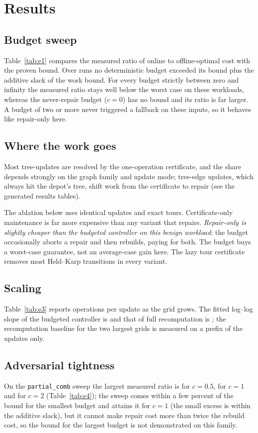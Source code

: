 \documentclass[conference]{IEEEtran}
\begin{document}
\section{Results}
\subsection{Budget sweep}
Table~\ref{tab:e1} compares the measured ratio of online to offline-optimal cost with the proven bound.
Over \EOneRows{} runs no deterministic budget exceeded its bound plus the additive slack of the work bound. For every budget strictly between zero and infinity the measured ratio stays well below the worst case on these workloads, whereas the never-repair budget ($c=0$) has no bound and its ratio is far larger. A budget of two or more never triggered a fallback on these inputs, so it behaves like repair-only here.


\subsection{Where the work goes}
Most tree-updates are resolved by the one-operation certificate, and the share depends strongly on the graph family and update mode; tree-edge updates, which always hit the depot's tree, shift work from the certificate to repair (see the generated results tables).

The ablation below uses identical updates and exact tours. Certificate-only maintenance is far more expensive than any variant that repairs. \emph{Repair-only is slightly cheaper than the budgeted controller on this benign workload}: the budget occasionally aborts a repair and then rebuilds, paying for both. The budget buys a worst-case guarantee, not an average-case gain here. The lazy tour certificate removes most Held--Karp transitions in every variant.


\subsection{Scaling}
Table~\ref{tab:e3} reports operations per update as the grid grows. The fitted log--log slope of the budgeted controller is \EThreeSlopeGP{} and that of full recomputation is \EThreeSlopeRebuild{}; the recomputation baseline for the two largest grids is measured on a prefix of the updates only.


\subsection{Adversarial tightness}
On the \texttt{partial\_comb} sweep the largest measured ratio is \EFourMaxHalf{} for $c=0.5$, \EFourMaxOne{} for $c=1$ and \EFourMaxTwo{} for $c=2$ (Table~\ref{tab:e4}); the sweep comes within a few percent of the bound for the smallest budget and attains it for $c=1$ (the small excess is within the additive slack), but it cannot make repair cost more than twice the rebuild cost, so the bound for the largest budget is not demonstrated on this family.

\end{document}
